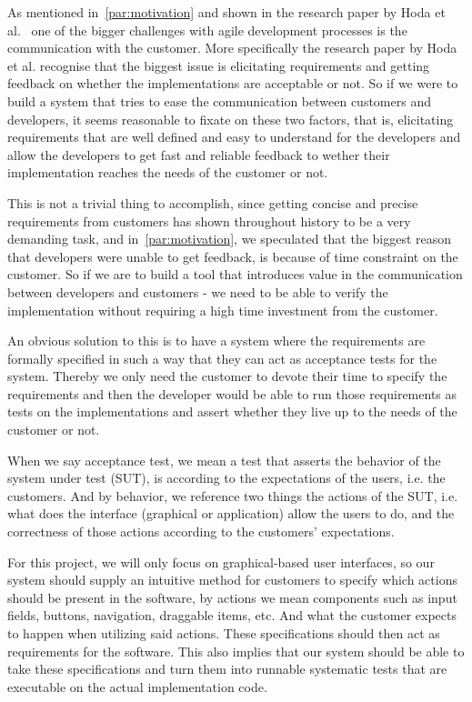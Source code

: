 As mentioned in~\autoref{par:motivation} and shown in the research paper by Hoda et al.~\cite{Hoda2011TheIO} one of the bigger challenges with agile development processes is the communication with the customer.
More specifically the research paper by Hoda et al. recognise that the biggest issue is elicitating requirements and getting feedback on whether the implementations are acceptable or not.
So if we were to build a system that tries to ease the communication between customers and developers, it seems reasonable to fixate on these two factors, that is, elicitating requirements that are well defined and easy to understand for the developers and allow the developers to get fast and reliable feedback to wether their implementation reaches the needs of the customer or not.

This is not a trivial thing to accomplish, since getting concise and precise requirements from customers has shown throughout history to be a very demanding task, and in~\autoref{par:motivation}, we speculated that the biggest reason that developers were unable to get feedback, is because of time constraint on the customer.
So if we are to build a tool that introduces value in the communication between developers and customers - we need to be able to verify the implementation without requiring a high time investment from the customer.

An obvious solution to this is to have a system where the requirements are formally specified in such a way that they can act as acceptance tests for the system.
Thereby we only need the customer to devote their time to specify the requirements and then the developer would be able to run those requirements as tests on the implementations and assert whether they live up to the needs of the customer or not.

When we say acceptance test, we mean a test that asserts the behavior of the system under test (SUT), is according to the expectations of the users, i.e. the customers.
And by behavior, we reference two things the actions of the SUT, i.e. what does the interface (graphical or application) allow the users to do, and the correctness of those actions according to the customers' expectations.

For this project, we will only focus on graphical-based user interfaces, so our system should supply an intuitive method for customers to specify which actions should be present in the software, by actions we mean components such as input fields, buttons, navigation, draggable items, etc.
And what the customer expects to happen when utilizing said actions.
These specifications should then act as requirements for the software.
This also implies that our system should be able to take these specifications and turn them into runnable systematic tests that are executable on the actual implementation code.

